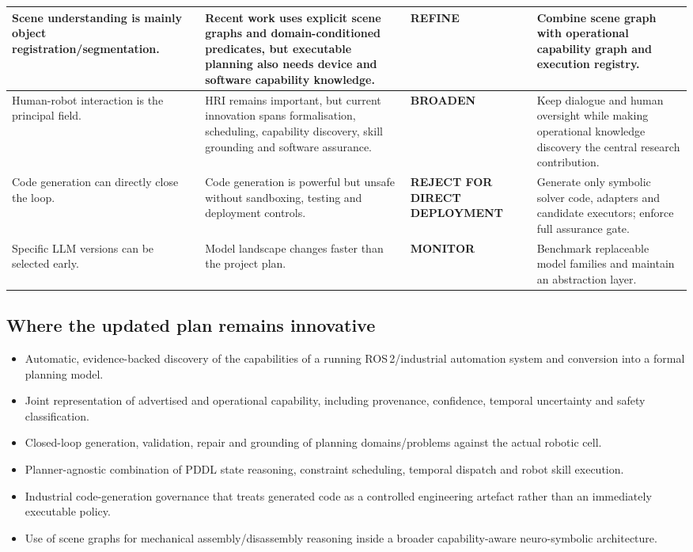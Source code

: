 \documentclass{plan4ari_report}
\begin{document}
{\begin{longtable}{|L{3.1cm}|L{4.5cm}|L{1.9cm}|L{4.8cm}|}
Scene understanding is mainly object registration/segmentation. & Recent work uses explicit scene graphs and domain-conditioned predicates, but executable planning also needs device and software capability knowledge. & \textbf{REFINE} & Combine scene graph with operational capability graph and execution registry. \\ \hline
Human-robot interaction is the principal field. & HRI remains important, but current innovation spans formalisation, scheduling, capability discovery, skill grounding and software assurance. & \textbf{BROADEN} & Keep dialogue and human oversight while making operational knowledge discovery the central research contribution. \\ \hline
Code generation can directly close the loop. & Code generation is powerful but unsafe without sandboxing, testing and deployment controls. & \textbf{REJECT FOR DIRECT DEPLOY\-MENT} & Generate only symbolic solver code, adapters and candidate executors; enforce full assurance gate. \\ \hline
Specific LLM versions can be selected early. & Model landscape changes faster than the project plan. & \textbf{MONITOR} & Benchmark replaceable model families and maintain an abstraction layer. \\ \hline
\end{longtable}}

\subsection{Where the updated plan remains innovative}
\begin{itemize}
\item Automatic, evidence-backed discovery of the capabilities of a running ROS\,2/industrial automation system and conversion into a formal planning model.
\item Joint representation of advertised and operational capability, including provenance, confidence, temporal uncertainty and safety classification.
\item Closed-loop generation, validation, repair and grounding of planning domains/problems against the actual robotic cell.
\item Planner-agnostic combination of PDDL state reasoning, constraint scheduling, temporal dispatch and robot skill execution.
\item Industrial code-generation governance that treats generated code as a controlled engineering artefact rather than an immediately executable policy.
\item Use of scene graphs for mechanical assembly/disassembly reasoning inside a broader capability-aware neuro-symbolic architecture.
\end{itemize}
\end{document}
